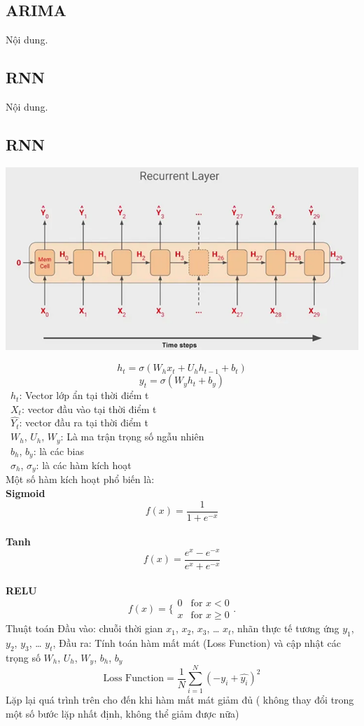 \subsection{ARIMA}
Nội dung.

\subsection{RNN}
Nội dung. 
\subsection{RNN}
\begin{minipage}{0.45\textwidth}
\centering
\includegraphics[width=1\textwidth]{resources/chapter-4/rnn-1.png}
\end{minipage}
\[h_t = \sigma (W_{h}x_{t} + U_h h_{t-1} + b_t) \]
\[y_t = \sigma (W_{y} h_t + b_y)\]
    \indent\textbullet\ \(h_t\): Vector lớp ẩn tại thời điểm t\\
    \indent\textbullet\ \(X_t\): vector đầu vào tại thời điểm t\\
    \indent\textbullet\ \(\widehat{Y_t}\): vector đầu ra tại thời điểm t\\
    \indent\textbullet\ \(W_h\), \(U_h\), \(W_y\): Là ma trận trọng số ngẫu nhiên\\
    \indent\textbullet\ \(b_h\), \(b_y\): là các bias\\
    \indent\textbullet\ \(\sigma_h\), \(\sigma_y\): là các hàm kích hoạt\\

Một số hàm kích hoạt phổ biến là:
\\ \textbf{Sigmoid}
\[f(x)=\frac{1}{1+e^{-x}}\]
\\ \textbf{Tanh}
\[f(x) = \frac{e^x - e^{-x}}{e^x + e^{-x}}\]
\\ \textbf{RELU}
\[f(x)=\{\begin{matrix}
0 & \text{for } x<0 \\
x & \text{for } x\ge0
\end{matrix}.\]
Thuật toán
Đầu vào: chuỗi thời gian \(x_1\), \(x_2\), \(x_3\), … \(x_t\), nhãn thực tế tương ứng \(y_1\), \(y_2\), \(y_3\), … \(y_t\),
Đầu ra: Tính toán hàm mất mát (Loss Function) và cập nhật các trọng số \(W_h\), \(U_h\), \(W_y\), \(b_h\), \(b_y\)
\[\text{Loss Function} = \frac{1}{N} \sum_{i=1}^{N} (-y_i + \hat{y_i})^2\]
Lặp lại quá trình trên cho đến khi hàm mất mát giảm đủ ( không thay đổi trong một số bước lặp nhất định, không thể giảm được nữa)
